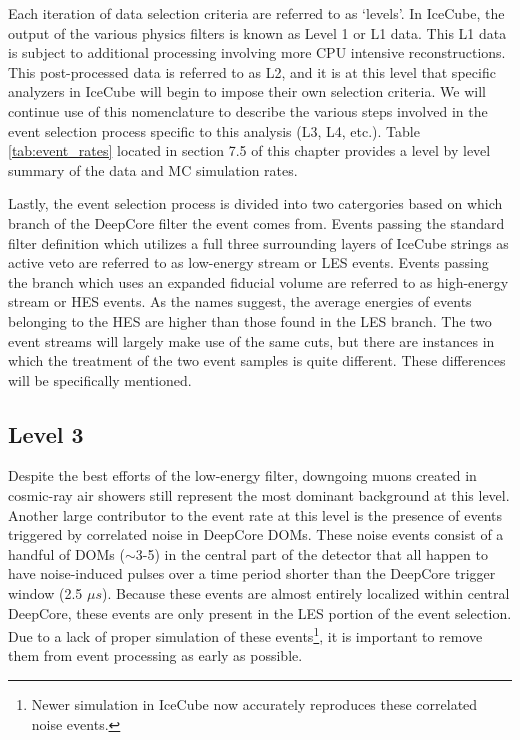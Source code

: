 \documentclass{gatech-thesis}
\begin{document}
Each iteration of data selection criteria are referred to as `levels'. In IceCube, the output of the various physics filters is known as Level 1 or L1 data. This L1 data is subject to additional processing involving more CPU intensive reconstructions. This post-processed data is referred to as L2, and it is at this level that specific analyzers in IceCube will begin to impose their own selection criteria. We will continue use of this nomenclature to describe the various steps involved in the event selection process specific to this analysis (L3, L4, etc.). Table \ref{tab:event_rates} located in section 7.5 of this chapter provides a level by level summary of the data and MC simulation rates.

Lastly, the event selection process is divided into two catergories based on which branch of the DeepCore filter the event comes from. Events passing the standard filter definition which utilizes a full three surrounding layers of IceCube strings as active veto are referred to as low-energy stream or LES events. Events passing the branch which uses an expanded fiducial volume are referred to as high-energy stream or HES events. As the names suggest, the average energies of events belonging to the HES are higher than those found in the LES branch. The two event streams will largely make use of the same cuts, but there are instances in which the treatment of the two event samples is quite different. These differences will be specifically mentioned.

\subsection{Level 3}
Despite the best efforts of the low-energy filter, downgoing muons created in cosmic-ray air showers still represent the most dominant background at this level. Another large contributor to the event rate at this level is the presence of events triggered by correlated noise in DeepCore DOMs. These noise events consist of a handful of DOMs ($\sim$3-5) in the central part of the detector that all happen to have noise-induced pulses over a time period shorter than the DeepCore trigger window (2.5 $\mu s$). Because these events are almost entirely localized within central DeepCore, these events are only present in the LES portion of the event selection. Due to a lack of proper simulation of these events\footnote{Newer simulation in IceCube now accurately reproduces these correlated noise events.}, it is important to remove them from event processing as early as possible.
\end{document}
